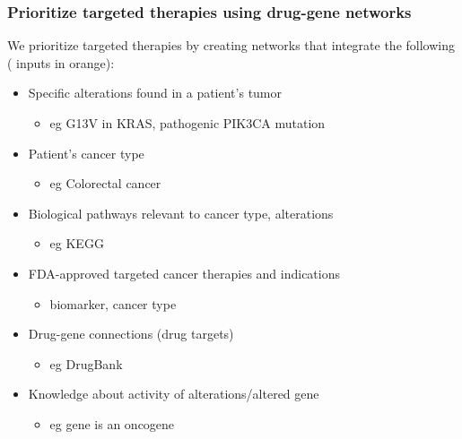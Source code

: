 \documentclass{beamer}
\begin{document}

\begin{frame}
\frametitle{Prioritize targeted therapies using drug-gene networks}

We prioritize targeted therapies by creating networks that integrate the following ({\color{orange} inputs in orange}):

\begin{itemize}
\item {\color{orange}Specific alterations found in a patient's tumor}
\begin{itemize}
\item eg G13V in KRAS, pathogenic PIK3CA mutation
\end{itemize}
\item {\color{orange}Patient's cancer type}
\begin{itemize}
\item eg Colorectal cancer
\end{itemize}
\item Biological pathways relevant to cancer type, alterations
\begin{itemize}
\item eg KEGG
\end{itemize}
\item FDA-approved targeted cancer therapies and indications
\begin{itemize}
\item biomarker, cancer type
\end{itemize}
\item Drug-gene connections (drug targets) 
\begin{itemize}
\item eg DrugBank
\end{itemize}
\item Knowledge about activity of alterations/altered gene
\begin{itemize}
\item eg gene is an oncogene
\end{itemize}

\end{itemize}

\end{frame}

\end{document}
